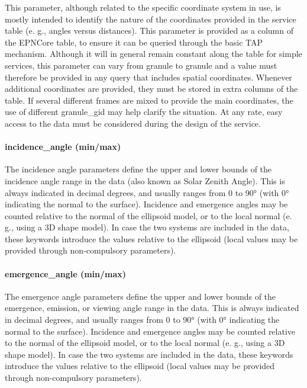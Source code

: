 \documentclass[11pt,a4paper]{ivoa}
\begin{document}
This parameter, although related to the specific coordinate system in use, is mostly intended to identify the nature of the coordinates provided in the service table (e. g., angles versus distances). This parameter is provided as a column of the EPNCore table, to ensure it can be queried through the basic TAP mechanism. Although it will in general remain constant along the table for simple services, this parameter can vary from granule to granule and a value must therefore be provided in any query that includes spatial coordinates. Whenever additional coordinates are provided, they must be stored in extra columns of the table. If several different frames are mixed to provide the main coordinates, the use of different granule\_gid may help clarify the situation. At any rate, easy access to the data must be considered during the design of the service. 

\paragraph{incidence\_angle (min/max)}

The incidence angle parameters define the upper and lower bounds of the incidence angle range in the data (also known as Solar Zenith Angle). This is always indicated in decimal degrees, and usually ranges from 0 to 90° (with 0° indicating the normal to the surface). Incidence and emergence angles may be counted relative to the normal of the ellipsoid model, or to the local normal (e. g., using a 3D shape model). In case the two systems are included in the data, these keywords introduce the values relative to the ellipsoid (local values may be provided through non-compulsory parameters).

\paragraph{emergence\_angle (min/max)}

The emergence angle parameters define the upper and lower bounds of the emergence, emission, or viewing angle range in the data. This is always indicated in decimal degrees, and usually ranges from 0 to 90° (with 0° indicating the normal to the surface). Incidence and emergence angles may be counted relative to the normal of the ellipsoid model, or to the local normal (e. g., using a 3D shape model). In case the two systems are included in the data, these keywords introduce the values relative to the ellipsoid (local values may be provided through non-compulsory parameters).
\end{document}
